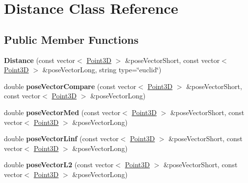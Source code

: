 \hypertarget{classDistance}{}\section{Distance Class Reference}
\label{classDistance}
\subsection*{Public Member Functions}
\begin{DoxyCompactItemize}
\item 
\hypertarget{classDistance_a93ae0141da318e4af1420fc6d0338765}{}{\bfseries Distance} (const vector$<$ \hyperlink{classPoint3D}{Point3\+D} $>$ \&pose\+Vector\+Short, const vector$<$ \hyperlink{classPoint3D}{Point3\+D} $>$ \&pose\+Vector\+Long, string type=\char`\"{}euclid\char`\"{})\label{classDistance_a93ae0141da318e4af1420fc6d0338765}

\item 
\hypertarget{classDistance_aaa19be6bb1ea10e548d50e647fe6d3ce}{}double {\bfseries pose\+Vector\+Compare} (const vector$<$ \hyperlink{classPoint3D}{Point3\+D} $>$ \&pose\+Vector\+Short, const vector$<$ \hyperlink{classPoint3D}{Point3\+D} $>$ \&pose\+Vector\+Long)\label{classDistance_aaa19be6bb1ea10e548d50e647fe6d3ce}

\item 
\hypertarget{classDistance_a5d4588343e2c7e57a1b917af10795d92}{}double {\bfseries pose\+Vector\+Med} (const vector$<$ \hyperlink{classPoint3D}{Point3\+D} $>$ \&pose\+Vector\+Short, const vector$<$ \hyperlink{classPoint3D}{Point3\+D} $>$ \&pose\+Vector\+Long)\label{classDistance_a5d4588343e2c7e57a1b917af10795d92}

\item 
\hypertarget{classDistance_a4f16092cbfe51aa5830695856838ba40}{}double {\bfseries pose\+Vector\+Linf} (const vector$<$ \hyperlink{classPoint3D}{Point3\+D} $>$ \&pose\+Vector\+Short, const vector$<$ \hyperlink{classPoint3D}{Point3\+D} $>$ \&pose\+Vector\+Long)\label{classDistance_a4f16092cbfe51aa5830695856838ba40}

\item 
\hypertarget{classDistance_a6445f4343bc1dc145aa63869f2933fc7}{}double {\bfseries pose\+Vector\+L2} (const vector$<$ \hyperlink{classPoint3D}{Point3\+D} $>$ \&pose\+Vector\+Short, const vector$<$ \hyperlink{classPoint3D}{Point3\+D} $>$ \&pose\+Vector\+Long)\label{classDistance_a6445f4343bc1dc145aa63869f2933fc7}

\end{DoxyCompactItemize}
